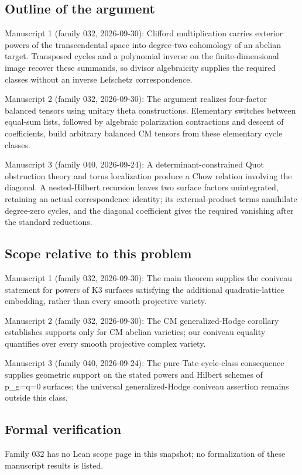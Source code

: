 \documentclass[11pt]{article}
\begin{document}
\subsection{Outline of the argument}
Manuscript 1 (family 032, 2026-09-30): Clifford multiplication carries exterior powers of the transcendental space into degree-two cohomology of an abelian target. Transposed cycles and a polynomial inverse on the finite-dimensional image recover these summands, so divisor algebraicity supplies the required classes without an inverse Lefschetz correspondence.

Manuscript 2 (family 032, 2026-09-30): The argument realizes four-factor balanced tensors using unitary theta constructions. Elementary switches between equal-sum lists, followed by algebraic polarization contractions and descent of coefficients, build arbitrary balanced CM tensors from these elementary cycle classes.

Manuscript 3 (family 040, 2026-09-24): A determinant-constrained Quot obstruction theory and torus localization produce a Chow relation involving the diagonal. A nested-Hilbert recursion leaves two surface factors unintegrated, retaining an actual correspondence identity; its external-product terms annihilate degree-zero cycles, and the diagonal coefficient gives the required vanishing after the standard reductions.

\subsection{Scope relative to this problem}
Manuscript 1 (family 032, 2026-09-30): The main theorem supplies the coniveau statement for powers of K3 surfaces satisfying the additional quadratic-lattice embedding, rather than every smooth projective variety.

Manuscript 2 (family 032, 2026-09-30): The CM generalized-Hodge corollary establishes supports only for CM abelian varieties; our coniveau equality quantifies over every smooth projective complex variety.

Manuscript 3 (family 040, 2026-09-24): The pure-Tate cycle-class consequence supplies geometric support on the stated powers and Hilbert schemes of p\_g=q=0 surfaces; the universal generalized-Hodge coniveau assertion remains outside this class.

\subsection{Formal verification}
Family 032 has no Lean scope page in this snapshot; no formalization of these manuscript results is listed.
\end{document}
